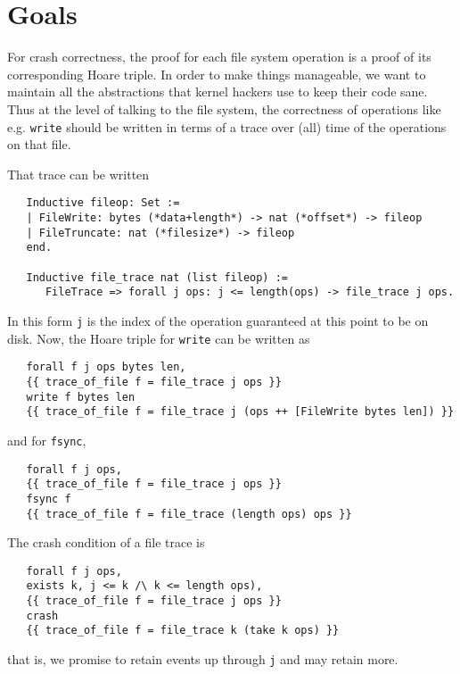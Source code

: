 \documentclass[11pt, twocolumn, letterpaper]{article}
\begin{document}
\section{Goals}

%

For crash correctness, the proof for each file system operation is a
proof of its corresponding Hoare triple.
In order to make things manageable, we want to maintain all the
abstractions that kernel hackers use to keep their code sane.
Thus at the level of talking to the file system, the correctness of
operations like e.g. \texttt{write} should be written in terms of
a trace over (all) time of the operations on that file.

That trace can be written
\begin{verbatim}
   Inductive fileop: Set :=
   | FileWrite: bytes (*data+length*) -> nat (*offset*) -> fileop
   | FileTruncate: nat (*filesize*) -> fileop
   end.

   Inductive file_trace nat (list fileop) :=
      FileTrace => forall j ops: j <= length(ops) -> file_trace j ops.
\end{verbatim}
In this form \texttt{j} is the index of the operation guaranteed at
this point to be on disk.
Now, the Hoare triple for \texttt{write} can be written as
\begin{verbatim}
   forall f j ops bytes len,
   {{ trace_of_file f = file_trace j ops }}
   write f bytes len
   {{ trace_of_file f = file_trace j (ops ++ [FileWrite bytes len]) }}
\end{verbatim}
and for \texttt{fsync},
\begin{verbatim}
   forall f j ops,
   {{ trace_of_file f = file_trace j ops }}
   fsync f
   {{ trace_of_file f = file_trace (length ops) ops }}
\end{verbatim}

The crash condition of a file trace is
\begin{verbatim}
   forall f j ops,
   exists k, j <= k /\ k <= length ops),
   {{ trace_of_file f = file_trace j ops }}
   crash
   {{ trace_of_file f = file_trace k (take k ops) }}
\end{verbatim}
that is, we promise to retain events up through \texttt{j} and may
retain more.
\end{document}
